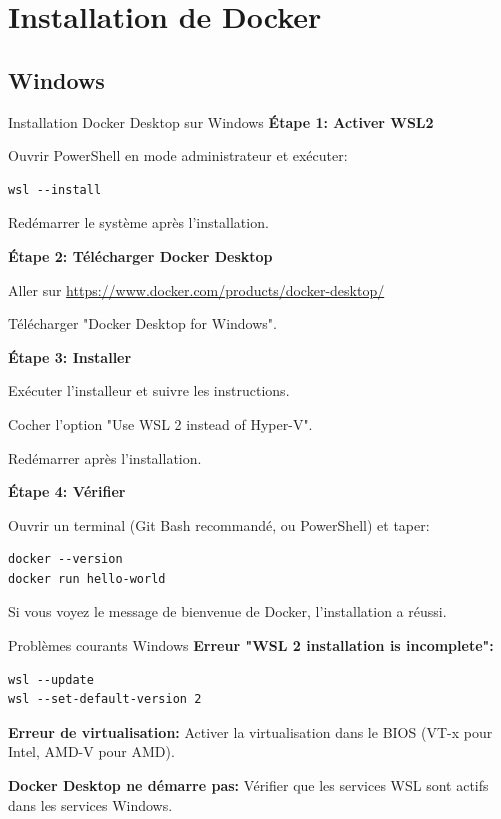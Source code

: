 \documentclass[10pt,a4paper]{article}
\begin{document}
\section{Installation de Docker}

\subsection{Windows}

\begin{exercicebox}{Installation Docker Desktop sur Windows}
\textbf{Étape 1: Activer WSL2}

Ouvrir PowerShell en mode administrateur et exécuter:
\begin{verbatim}
wsl --install
\end{verbatim}

Redémarrer le système après l'installation.

\textbf{Étape 2: Télécharger Docker Desktop}

Aller sur \url{https://www.docker.com/products/docker-desktop/}

Télécharger "Docker Desktop for Windows".

\textbf{Étape 3: Installer}

Exécuter l'installeur et suivre les instructions.

Cocher l'option "Use WSL 2 instead of Hyper-V".

Redémarrer après l'installation.

\textbf{Étape 4: Vérifier}

Ouvrir un terminal (Git Bash recommandé, ou PowerShell) et taper:
\begin{verbatim}
docker --version
docker run hello-world
\end{verbatim}

Si vous voyez le message de bienvenue de Docker, l'installation a réussi.
\end{exercicebox}

\begin{warningbox}{Problèmes courants Windows}
\textbf{Erreur "WSL 2 installation is incomplete":}
\begin{verbatim}
wsl --update
wsl --set-default-version 2
\end{verbatim}

\textbf{Erreur de virtualisation:}
Activer la virtualisation dans le BIOS (VT-x pour Intel, AMD-V pour AMD).

\textbf{Docker Desktop ne démarre pas:}
Vérifier que les services WSL sont actifs dans les services Windows.
\end{warningbox}
\end{document}
